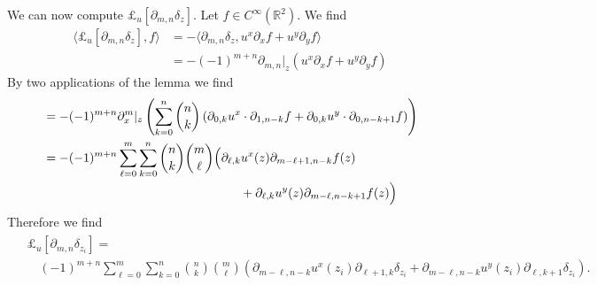 \documentclass[12pt]{amsart}
\newcommand{\R}{\ensuremath{\mathbb{R}}}
\begin{document}
We can now compute $\pounds_u[\partial_{m,n} \delta_z]$.
Let $f \in C^\infty(\R^2)$.  We find
\begin{align*}
  \langle \pounds_u [\partial_{m,n} \delta_z] , f \rangle 
  &= -\langle \partial_{m,n} \delta_z , u^x \partial_x f + u^y \partial_y f \rangle \\
  &= -(-1)^{m+n} \partial_{m,n}|_{z} \left( u^x \partial_x f + u^y \partial_y f \right)
\end{align*}
By two applications of the lemma we find
\begin{align*}
  &= -(-1)^{m+n} \partial_x^m|_z \left( \sum_{k=0}^{n} \binom{n}{k}
    \left(\partial_{0,k} u^x \cdot \partial_{1,n-k} f + \partial_{0,k} u^y \cdot \partial_{0,n-k+1} f \right)
    \right) \\
  &= -(-1)^{m+n} \sum_{\ell=0}^{m} \sum_{k=0}^{n} \binom{n}{k}\binom{m}{\ell}
    \Big(\partial_{\ell,k} u^x(z) \partial_{m-\ell+1,n-k} f(z) \\
     &\hskip 16em + \partial_{\ell,k} u^y(z) \partial_{m-\ell,n-k+1} f(z)
    \Big)
\end{align*}
Therefore we find
\begin{align}
  \begin{split}
  &\pounds_u[ \partial_{m,n} \delta_{z_i}] =\\
  &\quad (-1)^{m+n} \sum_{\ell=0}^m \sum_{k=0}^n \binom{n}{k} \binom{m}{\ell}
   \left(\partial_{m-\ell,n-k}u^x(z_i) \partial_{\ell+1,k} \delta_{z_i}
     +\partial_{m-\ell,n-k}u^y(z_i) \partial_{\ell,k+1} \delta_{z_i}
     \right)
   .
   \end{split}
\end{align}



\end{document}
